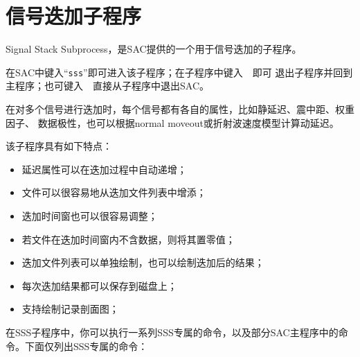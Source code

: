 \section{信号迭加子程序}
Signal Stack Subprocess，是SAC提供的一个用于信号迭加的子程序。

在SAC中键入``\verb+sss+''即可进入该子程序；在子程序中键入~~即可
退出子程序并回到主程序；也可键入~~直接从子程序中退出SAC。

在对多个信号进行迭加时，每个信号都有各自的属性，比如静延迟、震中距、权重因子、
数据极性，也可以根据normal moveout或折射波速度模型计算动延迟。

该子程序具有如下特点：
\begin{itemize}
\item 延迟属性可以在迭加过程中自动递增；
\item 文件可以很容易地从迭加文件列表中增添；
\item 迭加时间窗也可以很容易调整；
\item 若文件在迭加时间窗内不含数据，则将其置零值；
\item 迭加文件列表可以单独绘制，也可以绘制迭加后的结果；
\item 每次迭加结果都可以保存到磁盘上；
\item 支持绘制记录剖面图；
\end{itemize}

在SSS子程序中，你可以执行一系列SSS专属的命令，以及部分SAC主程序中的命令。下面仅列出SSS专属的命令：

